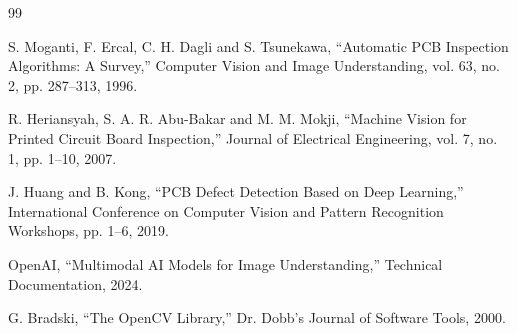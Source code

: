 \documentclass[12pt,a4paper]{report}
\begin{document}
\begin{thebibliography}{99}

S. Moganti, F. Ercal, C. H. Dagli and S. Tsunekawa, ``Automatic PCB Inspection Algorithms: A Survey,'' Computer Vision and Image Understanding, vol. 63, no. 2, pp. 287--313, 1996.

R. Heriansyah, S. A. R. Abu-Bakar and M. M. Mokji, ``Machine Vision for Printed Circuit Board Inspection,'' Journal of Electrical Engineering, vol. 7, no. 1, pp. 1--10, 2007.

J. Huang and B. Kong, ``PCB Defect Detection Based on Deep Learning,'' International Conference on Computer Vision and Pattern Recognition Workshops, pp. 1--6, 2019.

OpenAI, ``Multimodal AI Models for Image Understanding,'' Technical Documentation, 2024.

G. Bradski, ``The OpenCV Library,'' Dr. Dobb's Journal of Software Tools, 2000.

\end{thebibliography}
\end{document}
